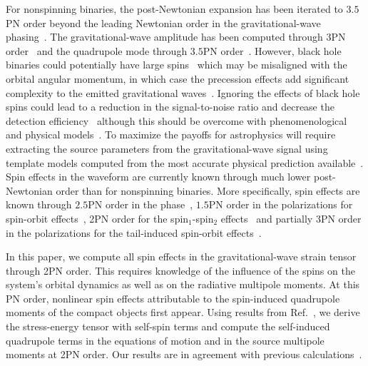 \documentclass[aps, prd,
twocolumn,%
superscriptaddress,
showpacs, nofootinbib, eqsecnum, amsmath, amssymb, floatfix
]{revtex4}
\begin{document}
For nonspinning binaries, the post-Newtonian expansion has been iterated to
$3.5$PN order beyond the leading Newtonian order in the gravitational-wave
phasing~\cite{Blanchet95a, Blanchet04, Blanchet2005b}. The gravitational-wave
amplitude has been computed through $3$PN
order~\cite{Blanchet96a, Kidder07, Kidder2008, BFIS} and the quadrupole mode
through $3.5$PN order~\cite{Faye:2012we}. However, black hole binaries could
potentially have large spins~\cite{Miller2009} which may be misaligned with
the orbital angular momentum, in which case the precession effects add
significant complexity to the emitted gravitational
waves~\cite{Apostolatos1994}. Ignoring the effects of black hole spins could
lead to a reduction in the signal-to-noise ratio and decrease the detection
efficiency~\cite{Apostolatos1996, Buonanno:2002fy} although this should be
overcome with phenomenological and physical
models~\cite{Pan:2003qt, Buonanno2004, Buonanno:2005pt, Buonanno06,
  Ajith:2009, Pan:2009wj, Ajith:2011ec, Brown:2012gs, Taracchini:2012ig}.
To maximize the payoffs for astrophysics will require extracting the source
parameters from the gravitational-wave signal using template models computed
from the most accurate physical prediction
available~\cite{CutlerFlanagan1994, PoissonWill95, vanderSluys, AjithBose2009}.
Spin effects in the waveform are currently known through much lower
post-Newtonian order than for nonspinning binaries. More specifically, spin
effects are known through $2.5$PN order in the
phase~\cite{Mikoczi:2005dn,Faye-Blanchet-Buonanno:2006,
Blanchet-Buonanno-Faye:2006}, $1.5$PN
order in the polarizations for spin-orbit effects~\cite{Kidder:1995zr,
  Arun:2009}, 2PN order for the spin${}_1$-spin${}_2$
effects~\cite{Kidder:1995zr, Will96} and partially $3$PN order in the
polarizations for the tail-induced spin-orbit
effects~\cite{BlanchetEtAl:2011}.

In this paper, we compute all spin effects in the gravitational-wave
strain tensor through 2PN order. This requires knowledge of the
influence of the spins on the system's orbital dynamics as well as
on the radiative multipole moments. At this PN order, nonlinear spin
effects attributable to the spin-induced quadrupole moments of the
compact objects first appear. Using results from
Ref.~\cite{1980AnPhy.130..188B,PortoRothstein2006,Porto:2008jj,SP10},
we derive the stress-energy tensor with self-spin terms and compute
the self-induced quadrupole terms in the equations of motion and in
the source multipole moments at 2PN order. Our results are in
agreement with previous calculations~\cite{Poisson:1997ha,Damour01c,
Steinhoff:2010zz,Porto:2012x}.
\end{document}
